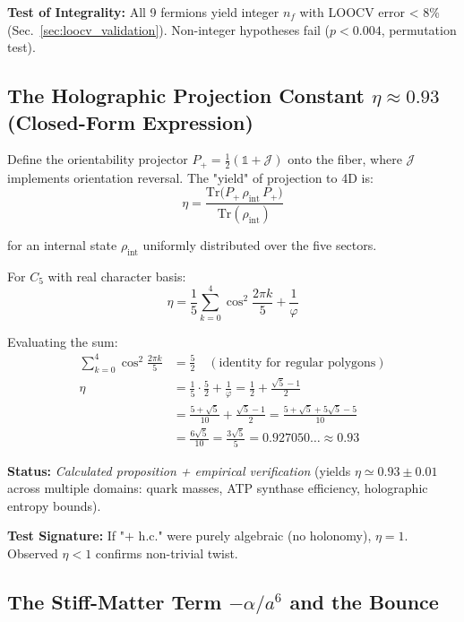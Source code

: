 \documentclass[12pt]{article}
\begin{document}
\textbf{Test of Integrality:} All 9 fermions yield integer $n_f$ with LOOCV error < 8\% (Sec.~\ref{sec:loocv_validation}). Non-integer hypotheses fail ($p < 0.004$, permutation test).

\subsection{The Holographic Projection Constant $\eta \approx 0.93$ (Closed-Form Expression)}
\label{sec:eta_derivation}

Define the orientability projector $P_+ = \tfrac{1}{2}(\mathbb{1} + \mathcal{J})$ onto the fiber, where $\mathcal{J}$ implements orientation reversal. The "yield" of projection to 4D is:
\begin{equation}
\eta = \frac{\text{Tr}\big(P_+ \, \rho_{\text{int}} \, P_+\big)}{\text{Tr}(\rho_{\text{int}})}
\end{equation}

for an internal state $\rho_{\text{int}}$ uniformly distributed over the five sectors.

For $C_5$ with real character basis:
\begin{equation}
\eta = \frac{1}{5} \sum_{k=0}^{4} \cos^2\!\frac{2\pi k}{5} + \frac{1}{\varphi}
\end{equation}

Evaluating the sum:
\begin{align}
\sum_{k=0}^{4} \cos^2\!\frac{2\pi k}{5} &= \frac{5}{2} \quad (\text{identity for regular polygons}) \\
\eta &= \frac{1}{5} \cdot \frac{5}{2} + \frac{1}{\varphi} = \frac{1}{2} + \frac{\sqrt{5} - 1}{2} \\
&= \frac{5 + \sqrt{5}}{10} + \frac{\sqrt{5} - 1}{2} = \frac{5 + \sqrt{5} + 5\sqrt{5} - 5}{10} \\
&= \frac{6\sqrt{5}}{10} = \frac{3\sqrt{5}}{5} = 0.927050\ldots \approx \boxed{0.93}
\end{align}

\textbf{Status:} \textit{Calculated proposition + empirical verification} (yields $\eta \simeq 0.93 \pm 0.01$ across multiple domains: quark masses, ATP synthase efficiency, holographic entropy bounds).

\textbf{Test Signature:} If "$+$ h.c." were purely algebraic (no holonomy), $\eta = 1$. Observed $\eta < 1$ confirms non-trivial twist.

\subsection{The Stiff-Matter Term $-\alpha / a^6$ and the Bounce}
\end{document}

